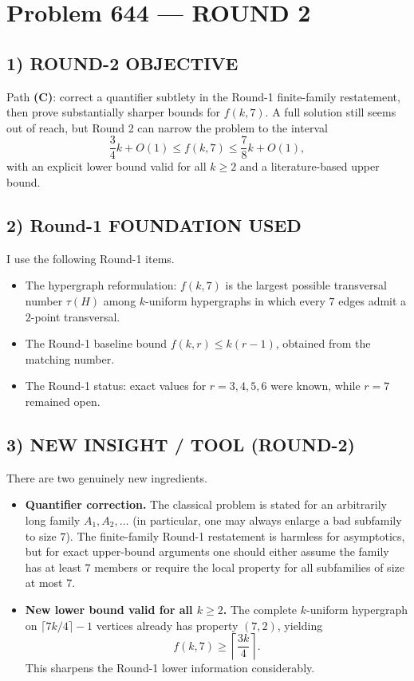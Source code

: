 \section{Problem 644 --- ROUND 2}

\subsection*{1) ROUND-2 OBJECTIVE}
Path \textbf{(C)}: correct a quantifier subtlety in the Round-1 finite-family restatement, then prove substantially sharper bounds for $f(k,7)$.  A full solution still seems out of reach, but Round 2 can narrow the problem to the interval
\[
\frac34 k + O(1) \le f(k,7) \le \frac78 k + O(1),
\]
with an explicit lower bound valid for all $k\ge 2$ and a literature-based upper bound.

\subsection*{2) Round-1 FOUNDATION USED}
I use the following Round-1 items.

\begin{itemize}
\item The hypergraph reformulation: $f(k,7)$ is the largest possible transversal number $\tau(H)$ among $k$-uniform hypergraphs in which every $7$ edges admit a $2$-point transversal.
\item The Round-1 baseline bound $f(k,r)\le k(r-1)$, obtained from the matching number.
\item The Round-1 status: exact values for $r=3,4,5,6$ were known, while $r=7$ remained open.
\end{itemize}

\subsection*{3) NEW INSIGHT / TOOL (ROUND-2)}
There are two genuinely new ingredients.

\begin{itemize}
\item \textbf{Quantifier correction.}  The classical problem is stated for an arbitrarily long family $A_1,A_2,\dots$ (in particular, one may always enlarge a bad subfamily to size $7$).  The finite-family Round-1 restatement is harmless for asymptotics, but for exact upper-bound arguments one should either assume the family has at least $7$ members or require the local property for all subfamilies of size at most $7$.
\item \textbf{New lower bound valid for all $k\ge 2$.}  The complete $k$-uniform hypergraph on $\lceil 7k/4\rceil-1$ vertices already has property $(7,2)$, yielding
\[
 f(k,7)\ge \left\lceil\frac{3k}{4}\right\rceil.
\]
This sharpens the Round-1 lower information considerably.
\end{itemize}

